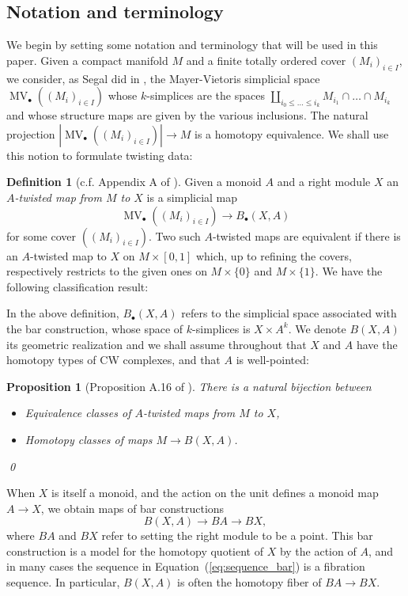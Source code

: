\documentclass[reqno]{amsart}
\theoremstyle{theorem}
\newtheorem{proposition}[corollary]{Proposition}
\theoremstyle{remark}
\theoremstyle{definition}
\newtheorem{definition}[corollary]{Definition}
\DeclareMathOperator{\MV}{MV}
\begin{document}
\subsection{Notation and terminology} \label{sec:notation-terminology}
We begin by setting some notation and terminology that will be used in this paper. Given a compact manifold $M$ and a finite totally ordered cover $(M_i)_{i\in I}$, we consider, as Segal did in \cite{S},
the Mayer-Vietoris simplicial space $\MV_\bullet((M_i)_{i\in I})$ whose $k$-simplices
are the spaces $\coprod_{i_0\leq\dots \leq i_k} M_{i_1}\cap \dots \cap M_{i_k}$ and whose structure maps
are given by the various inclusions. The natural projection
$|\MV_\bullet((M_i)_{i\in I})| \to M$ is a homotopy equivalence. We shall use this notion to formulate twisting data:
\begin{definition}[c.f. Appendix A of \cite{ACGK}]
Given a monoid $A$ and a right module $X$ an \emph{$A$-twisted map from $M$ to $X$} is a simplicial map
\[\MV_\bullet((M_i)_{i\in I})\to B_\bullet(X,A)\]
for some cover $((M_i)_{i\in I})$. Two such $A$-twisted maps are equivalent if there is an $A$-twisted map to $X$ on $M\times [0,1]$ which, up to refining the covers, respectively restricts to the given ones on $M\times \{0\}$
and $M\times \{1\}$. We have the following classification result: 
\end{definition}
In the above definition, $  B_\bullet(X,A)$ refers to the simplicial space associated with the bar construction,  whose space of $k$-simplices is $X\times A^k$. We denote $B(X,A)$ its geometric realization and we shall assume throughout that $X$ and $A$ have the homotopy types of CW complexes, and that $A$ is well-pointed:
\begin{proposition}[Proposition A.16 of \cite{ACGK}] \label{prop:homotopy_class_twsited}
There is a natural bijection between
\begin{itemize}
\item Equivalence classes of $A$-twisted maps from $M$ to $X$,
\item Homotopy classes of maps $M\to B(X,A)$.
\end{itemize} \qed
\end{proposition}
 
When $X$ is itself a monoid, and the action on the unit defines a monoid map $A \to X$, we obtain maps of bar constructions
\begin{equation} \label{eq:sequence_bar}
B(X,A)\to BA \to BX,  
\end{equation}
where $BA$ and $BX$ refer to setting the right module to be a point. This bar construction is a model for the homotopy quotient of $X$ by the action of $A$, and in many cases the sequence in Equation~(\ref{eq:sequence_bar}) is a fibration sequence. In particular, $B(X,A)$ is often the homotopy fiber of $BA\to BX$.
\end{document}

